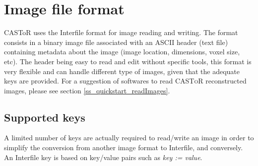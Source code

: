 \documentclass[a4paper, 11pt]{article}
\newcommand{\castor}{\textsc{CASToR}\xspace}
\begin{document}
\clearpage
\section{Image file format}
\label{s_interfile}

CASToR uses the Interfile format for image reading and writing. The format consists in a binary image file associated with an ASCII header (text file)
containing metadata about the image (image location, dimensions, voxel size, etc). The header being easy to read and edit without specific tools,
this format is very flexible and can handle different type of images, given that the adequate keys are provided. For a suggestion of softwares to read \castor reconstructed images, please see section \ref{ss_quickstart_readImages}.

\subsection{Supported keys}
\label{ss_intf_keys}

A limited number of keys are actually required to read/write an image in order to simplify the conversion from another image format to Interfile,
and conversely. An Interfile key is based on key/value pairs such as \textit{key := value}. 
\end{document}
